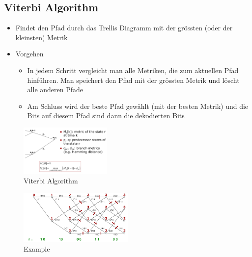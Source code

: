 \hypertarget{viterbi-algorithm}{%
\subsection{Viterbi Algorithm}\label{viterbi-algorithm}}

\begin{itemize}
\tightlist
\item
  Findet den Pfad durch das Trellis Diagramm mit der grössten (oder der
  kleinsten) Metrik
\item
  Vorgehen

  \begin{itemize}
  \tightlist
  \item
    In jedem Schritt vergleicht man alle Metriken, die zum aktuellen
    Pfad hinführen. Man speichert den Pfad mit der grössten Metrik und
    löscht alle anderen Pfade
  \item
    Am Schluss wird der beste Pfad gewählt (mit der besten Metrik) und
    die Bits auf diesem Pfad sind dann die dekodierten Bits
  \end{itemize}
\end{itemize}

\begin{figure}[H]
\centering
\includegraphics[width=0.4\textwidth]{figures/viterbi_algorithm.png}
\caption{Viterbi Algorithm}
\end{figure}

\begin{figure}[H]
\centering
\includegraphics[width=0.5\textwidth]{figures/viterbi_example.png}
\caption{Example}
\end{figure}

